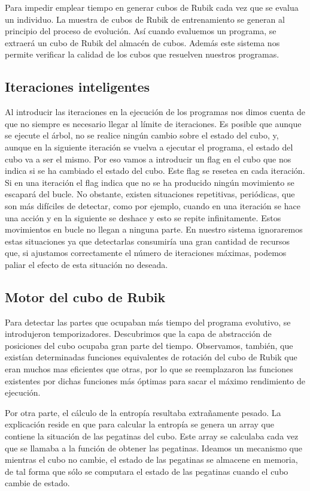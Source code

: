 Para impedir emplear tiempo en generar cubos de Rubik cada vez que se evalua un
individuo. La muestra de cubos de Rubik de entrenamiento se generan al principio
del proceso de evolución. Así cuando evaluemos un programa, se extraerá un cubo
de Rubik del almacén de cubos. Además este sistema nos permite verificar la
calidad de los cubos que resuelven nuestros programas.

\subsection{Iteraciones inteligentes}\label{subsec:iteraciones-inteligentes}

Al introducir las iteraciones en la ejecución de los programas nos dimos cuenta
de que no siempre es necesario llegar al límite de iteraciones. Es posible que
aunque se ejecute el árbol, no se realice ningún cambio sobre el estado del cubo,
y, aunque en la siguiente iteración se vuelva a ejecutar el programa, el estado
del cubo va a ser el mismo. Por eso vamos a introducir un flag en el cubo que nos
indica si se ha cambiado el estado del cubo. Este flag se resetea en cada
iteración. Si en una iteración el flag indica que no se ha producido ningún
movimiento se escapará del bucle. No obstante, existen situaciones repetitivas,
periódicas, que son más difíciles de detectar, como por ejemplo, cuando en una
iteración se hace una acción y en la siguiente se deshace y esto se repite
infinitamente. Estos movimientos en bucle no llegan a ninguna parte. En nuestro
sistema ignoraremos estas situaciones ya que detectarlas consumiría una gran
cantidad de recursos que, si ajustamos correctamente el número de iteraciones
máximas, podemos paliar el efecto de esta situación no deseada.

\subsection{Motor del cubo de Rubik}\label{subsec:motor-cubo-rubik}

Para detectar las partes que ocupaban más tiempo del programa evolutivo, se
introdujeron temporizadores. Descubrimos que la capa de abstracción de posiciones
del cubo ocupaba gran parte del tiempo. Observamos, también, que existían
determinadas funciones equivalentes de rotación del cubo de Rubik que eran muchos
mas eficientes que otras, por lo que se reemplazaron las funciones existentes por
dichas funciones más óptimas para sacar el máximo rendimiento de ejecución.

Por otra parte, el cálculo de la entropía resultaba extrañamente pesado. La
explicación reside en que para calcular la entropía se genera un array que
contiene la situación de las pegatinas del cubo. Este array se calculaba cada vez
que se llamaba a la función de obtener las pegatinas. Ideamos un mecanismo que
mientras el cubo no cambie, el estado de las pegatinas se almacene en memoria, de
tal forma que sólo se computara el estado de las pegatinas cuando el cubo cambie
de estado.
